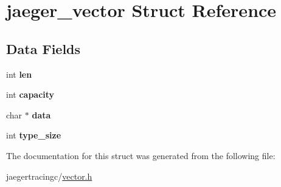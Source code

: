 \hypertarget{structjaeger__vector}{}\section{jaeger\+\_\+vector Struct Reference}
\label{structjaeger__vector}
\subsection*{Data Fields}
\begin{DoxyCompactItemize}
\item 
\mbox{\label{structjaeger__vector_a4bfd41267529f2e783322a79031973d5}} 
int {\bfseries len}
\item 
\mbox{\label{structjaeger__vector_a0bcd915b0a27f07520d0d6379acd2b14}} 
int {\bfseries capacity}
\item 
\mbox{\label{structjaeger__vector_a53145adeb50480d5ba7f8ab16f51b903}} 
char $\ast$ {\bfseries data}
\item 
\mbox{\label{structjaeger__vector_a3a0341d861c8828e438c605c7e525b15}} 
int {\bfseries type\+\_\+size}
\end{DoxyCompactItemize}


The documentation for this struct was generated from the following file\+:\begin{DoxyCompactItemize}
\item 
jaegertracingc/\mbox{\hyperlink{vector_8h}{vector.\+h}}\end{DoxyCompactItemize}
